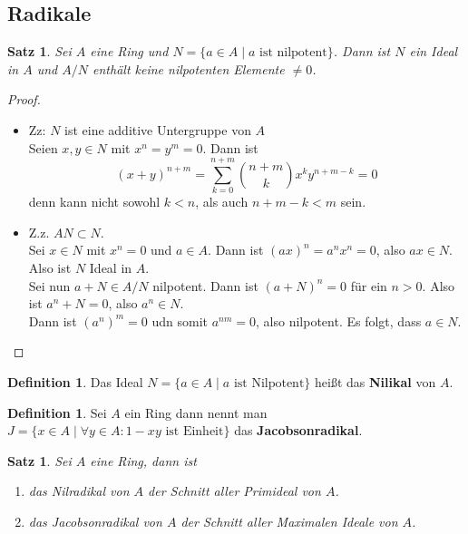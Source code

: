 \documentclass[10pt,a4paper]{article}
\theoremstyle{plain}
\newtheorem{satz}[theorem]{Satz}
\theoremstyle{definition}
\newtheorem{definition}[theorem]{Definition}
\theoremstyle{remark}
\begin{document}
	\subsection{Radikale}
	\begin{satz}
		Sei $A$ eine Ring und $N=\{a\in A\mid \text{$a$ ist nilpotent}\}$. Dann ist $N$ ein Ideal in $A$ und $A/N$ enthält keine nilpotenten Elemente $\neq 0$.
	\end{satz}
	\begin{proof}
		\begin{itemize}
			\item Zz: $N$ ist eine additive Untergruppe von $A$\\
			Seien $x,y\in N$ mit $x^n=y^m=0$. Dann ist
			\[(x+y)^{n+m}=\sum_{k=0}^{n+m}\binom{n+m}{k}x^ky^{n+m-k}=0\]
			denn kann nicht sowohl $k<n$, als auch $n+m-k<m$ sein.
			\item Z.z. $AN\subset N$.\\
			Sei $x\in N$ mit $x^n=0$ und $a\in A$.
			Dann ist $(ax)^n=a^nx^n=0$, also $ax\in N$.\\
			Also ist $N$ Ideal in $A$.\\
			Sei nun $a+N\in A/N$ nilpotent. Dann ist $(a+N)^n=0$ für ein $n>0$. Also ist $a^n+N=0$, also $a^n\in N$.\\
			Dann ist $(a^n)^m=0$ udn somit $a^{nm}=0$, also nilpotent. Es folgt, dass $a\in N$.
		\end{itemize}
	\end{proof}

	\begin{definition}
		Das Ideal $N=\{a\in A\mid\text{$a$ ist Nilpotent}\}$ heißt das \textbf{Nilikal} von $A$.
	\end{definition}

	\begin{definition}
		Sei $A$ ein Ring dann nennt man $J=\{x\in A\mid \forall y\in A:\text{$1-xy$ ist Einheit}\}$ das \textbf{Jacobsonradikal}.
	\end{definition}

	\begin{satz}
		Sei $A$ eine Ring, dann ist 
		\begin{enumerate}
			\item das Nilradikal von $A$ der Schnitt aller Primideal von $A$.
			\item das Jacobsonradikal von $A$ der Schnitt aller Maximalen Ideale von $A$.
		\end{enumerate}
	\end{satz}
\end{document}
